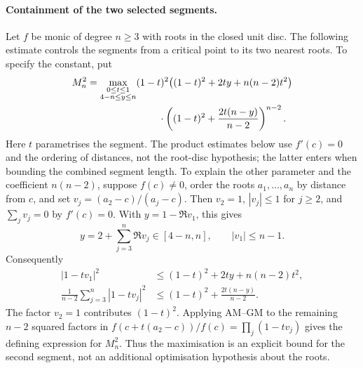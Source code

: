 \paragraph{Containment of the two selected segments.}
Let $f$ be monic of degree $n\ge3$ with roots in the closed unit disc.
The following estimate controls the segments from a critical point to
its two nearest roots. To specify the constant, put
\[
\begin{split}
 M_n^2=\max_{\substack{0\le t\le1\\4-n\le y\le n}}
 &(1-t)^2\bigl((1-t)^2+2ty+n(n-2)t^2\bigr)\\
 &\hspace{8mm}\cdot
 \left((1-t)^2+\frac{2t(n-y)}{n-2}\right)^{n-2}.
\end{split}
\]
Here $t$ parametrises the segment. The product estimates below use
$f'(c)=0$ and the ordering of distances, not the root-disc hypothesis;
the latter enters when bounding the combined segment length. To explain
the other parameter and the coefficient $n(n-2)$, suppose $f(c)\ne0$, order the roots
$a_1,\ldots,a_n$ by distance from $c$, and set
$v_j=(a_2-c)/(a_j-c)$. Then $v_2=1$, $|v_j|\le1$ for $j\ge2$,
and $\sum_jv_j=0$ by $f'(c)=0$. With $y=1-\Re v_1$, this gives
\[
 y=2+\sum_{j=3}^n\Re v_j\in[4-n,n],\qquad |v_1|\le n-1.
\]
Consequently
\[
\begin{split}
 |1-tv_1|^2&\le(1-t)^2+2ty+n(n-2)t^2,\\
 \frac1{n-2}\sum_{j=3}^n|1-tv_j|^2
 &\le(1-t)^2+\frac{2t(n-y)}{n-2}.
\end{split}
\]
The factor $v_2=1$ contributes $(1-t)^2$. Applying AM--GM to the
remaining $n-2$ squared factors in
$f(c+t(a_2-c))/f(c)=\prod_j(1-tv_j)$ gives the defining expression
for $M_n^2$. Thus the maximisation is an explicit bound for the second
segment, not an additional optimisation hypothesis about the roots.

